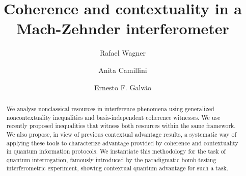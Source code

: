 \documentclass[a4paper,twocolumn,11pt,accepted=2024-01-17]{quantumarticle}
\begin{document}
\title{Coherence and contextuality in a Mach-Zehnder \newline interferometer }
\author{Rafael Wagner}
\author{Anita Camillini}
\author{Ernesto F. Galvão}

\maketitle

\begin{abstract}
      We analyse nonclassical resources in interference phenomena using generalized noncontextuality inequalities and basis-independent coherence witnesses. We use recently proposed inequalities that witness both resources within the same framework. We also propose, in view of previous contextual advantage results, a systematic way of applying these tools to characterize advantage provided by coherence and contextuality in quantum information protocols. We instantiate this methodology for the task of quantum interrogation, famously introduced by the paradigmatic bomb-testing interferometric experiment, showing contextual quantum advantage for such a task. 
\end{abstract}
\end{document}

